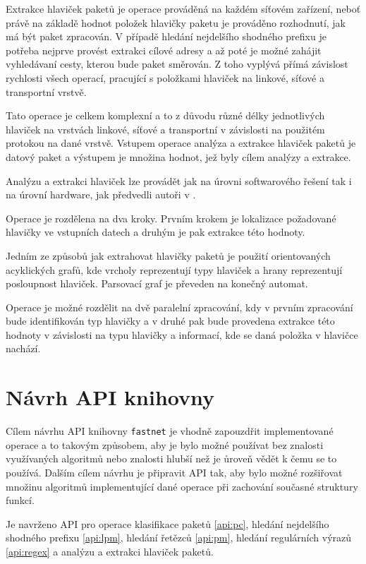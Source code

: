 Extrakce hlaviček paketů je operace prováděná na každém síťovém zařízení,
neboť právě na základě hodnot položek hlavičky paketu je prováděno rozhodnutí,
jak má být paket zpracován.
V případě hledání nejdelšího shodného prefixu je potřeba nejprve provést extrakci
cílové adresy a až poté je možné zahájit vyhledávaní cesty, kterou bude paket směrován.
Z toho vyplývá přímá závislost rychlosti všech operací, pracující s položkami hlaviček na linkové, síťové a
transportní vrstvě.

Tato operace je celkem komplexní a to z důvodu různé délky jednotlivých hlaviček na vrstvách
linkové, síťové a transportní v závislosti na použitém protokou na dané vrstvě.
Vstupem operace analýza a extrakce hlaviček paketů je datový paket a výstupem je
množina hodnot, jež byly cílem analýzy a extrakce.

Analýzu a extrakci hlaviček lze provádět jak na úrovni softwarového řešení tak i na úrovní hardware,
jak předvedli autoři v \cite{phe}.

Operace je rozdělena na dva kroky. Prvním krokem je lokalizace požadované hlavičky ve vstupních datech
a druhým je pak extrakce této hodnoty.

Jedním ze způsobů jak extrahovat hlavičky paketů je použití orientovaných acyklických grafů,
kde vrcholy reprezentují typy hlaviček a hrany reprezentují posloupnost hlaviček.
Parsovací graf je převeden na konečný automat.

Operace je možné rozdělit na dvě paralelní zpracování,
kdy v prvním zpracování bude identifikován typ hlavičky a v druhé pak bude provedena extrakce
této hodnoty v závislosti na typu hlavičky a informací, kde se daná položka v hlavičce nachází.

\chapter{Návrh API knihovny}\label{chapter:api} %

Cílem návrhu API knihovny \texttt{fastnet} je vhodně zapouzdřit implementované operace a to takovým způsobem,
aby je bylo možné používat bez znalosti využívaných algoritmů nebo znalosti
hlubší než je ůroveň vědět k čemu se to používá. Dalším cílem návrhu je připravit API tak,
aby bylo možné rozšiřovat množinu algoritmů implementující dané operace při zachování
současné struktury funkcí.

Je navrženo API pro operace klasifikace paketů \ref{api:pc}, hledání nejdelšího shodného prefixu
\ref{api:lpm}, hledání řetězců \ref{api:pm}, hledání regulárních výrazů \ref{api:regex} a analýzu a
extrakci hlaviček paketů.

